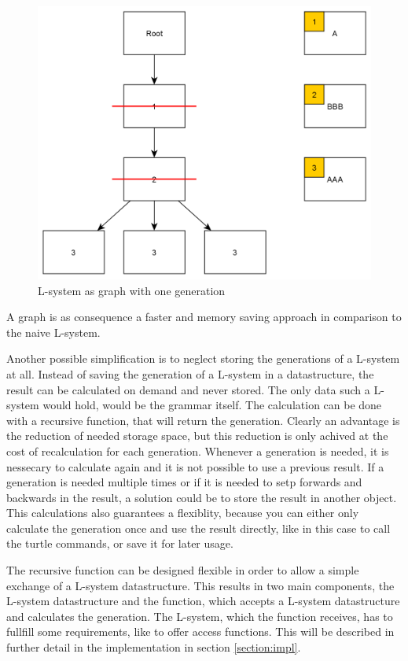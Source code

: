 \documentclass[english]{cpp-hmwk}
\begin{document}
\begin{figure}[h!]
	\centering
	\includegraphics[width=0.8\columnwidth]{../graphs/LSystem/examples/lsystem_graph_reduced2_example.png}
	\caption{L-system as graph with one generation}
	\label{figure:lsystem_graph_one_generation}
\end{figure}

\medskip
\noindent A graph is as consequence a faster and memory saving approach in comparison to the naive L-system.

\bigskip

\noindent Another possible simplification is to neglect storing the generations of a L-system at all. Instead of saving the generation of a L-system in a datastructure, the result can be calculated on demand and never stored. The only data such a L-system would hold, would be the grammar itself. The calculation can be done with a recursive function, that will return the generation. Clearly an advantage is the reduction of needed storage space, but this reduction is only achived at the cost of recalculation for each generation. Whenever a generation is needed, it is nessecary to calculate again and it is not possible to use a previous result.
If a generation is needed multiple times or if it is needed to setp forwards and backwards in the result, a solution could be to store the result in another object. This calculations also guarantees a flexiblity, because you can either only calculate the generation once and use the result directly, like in this case to call the turtle commands, or save it for later usage.
 
The recursive function can be designed flexible in order to allow a simple exchange of a L-system datastructure. This results in two main components, the L-system datastructure and the function, which accepts a L-system datastructure and calculates the generation. The L-system, which the function receives, has to fullfill some requirements, like to offer access functions. This will be described in further detail in the implementation in section \ref{section:impl}.
 
\end{document}
